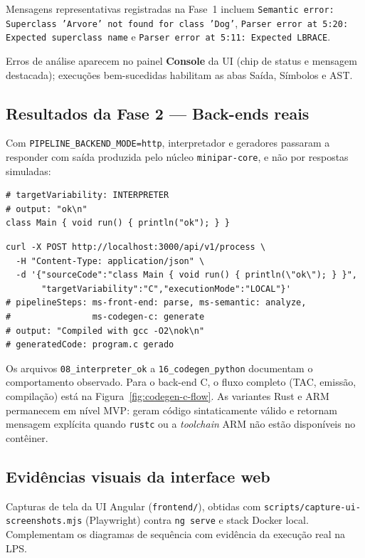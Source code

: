 \documentclass[12pt]{article}
\begin{document}
Mensagens representativas registradas na Fase~1 incluem \texttt{Semantic error: Superclass 'Arvore' not found for class 'Dog'}, \texttt{Parser error at 5:20: Expected superclass name} e \texttt{Parser error at 5:11: Expected LBRACE}.

Erros de análise aparecem no painel \textbf{Console} da UI (chip de status e mensagem destacada); execuções bem-sucedidas habilitam as abas Saída, Símbolos e AST.

\subsection{Resultados da Fase 2 --- Back-ends reais}
Com \texttt{PIPELINE\_BACKEND\_MODE=http}, interpretador e geradores passaram a responder com saída produzida pelo núcleo \texttt{minipar-core}, e não por respostas simuladas:

\begin{lstlisting}[caption={Interpretador --- stdout real}]
# targetVariability: INTERPRETER
# output: "ok\n"
class Main { void run() { println("ok"); } }
\end{lstlisting}

\begin{lstlisting}[caption={Codegen C --- resposta E2E}]
curl -X POST http://localhost:3000/api/v1/process \
  -H "Content-Type: application/json" \
  -d '{"sourceCode":"class Main { void run() { println(\"ok\"); } }",
       "targetVariability":"C","executionMode":"LOCAL"}'
# pipelineSteps: ms-front-end: parse, ms-semantic: analyze,
#                ms-codegen-c: generate
# output: "Compiled with gcc -O2\nok\n"
# generatedCode: program.c gerado
\end{lstlisting}

Os arquivos \texttt{08\_interpreter\_ok} a \texttt{16\_codegen\_python} documentam o comportamento observado. Para o back-end C, o fluxo completo (TAC, emissão, compilação) está na Figura~\ref{fig:codegen-c-flow}. As variantes Rust e ARM permanecem em nível MVP: geram código sintaticamente válido e retornam mensagem explícita quando \texttt{rustc} ou a \emph{toolchain} ARM não estão disponíveis no contêiner.

\subsection{Evidências visuais da interface web}
Capturas de tela da UI Angular (\texttt{frontend/}), obtidas com \texttt{scripts/capture-ui-screenshots.mjs} (Playwright) contra \texttt{ng serve} e stack Docker local. Complementam os diagramas de sequência com evidência da execução real na LPS.
\end{document}
